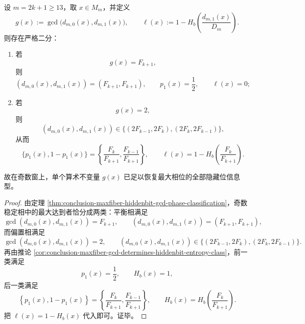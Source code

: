 \begin{theorem}\label{thm:conclusion-maxfiber-odd-gcd-determines-leakage-type}
设 \(m=2k+1\ge 13\)，取 \(x\in M_m\)，并定义
\[
g(x):=\gcd\bigl(d_{m,0}(x),d_{m,1}(x)\bigr),
\qquad
\ell(x):=1-H_b\!\left(\frac{d_{m,1}(x)}{D_m}\right).
\]
则存在严格二分：
\begin{enumerate}
\normalfont
  \item 若
  \[
  g(x)=F_{k+1},
  \]
  则
  \[
  (d_{m,0}(x),d_{m,1}(x))=(F_{k+1},F_{k+1}),
  \qquad
  p_1(x)=\frac12,
  \qquad
  \ell(x)=0;
  \]
  \item 若
  \[
  g(x)=2,
  \]
  则
  \[
  (d_{m,0}(x),d_{m,1}(x))
  \in
  \{(2F_{k-1},2F_k),(2F_k,2F_{k-1})\},
  \]
  从而
  \[
  \{p_1(x),1-p_1(x)\}
  =
  \left\{
  \frac{F_k}{F_{k+1}},
  \frac{F_{k-1}}{F_{k+1}}
  \right\},
  \qquad
  \ell(x)=1-H_b\!\left(\frac{F_k}{F_{k+1}}\right).
  \]
\end{enumerate}
故在奇数窗上，单个算术不变量 \(g(x)\) 已足以恢复最大相位的全部隐藏位信息型。
\end{theorem}
\begin{proof}
由定理 \ref{thm:conclusion-maxfiber-hiddenbit-gcd-phase-classification}，奇数稳定相中的最大达到者恰分成两类：平衡相满足
\[
\gcd(d_{m,0}(x),d_{m,1}(x))=F_{k+1},
\qquad
(d_{m,0}(x),d_{m,1}(x))=(F_{k+1},F_{k+1}),
\]
而偏置相满足
\[
\gcd(d_{m,0}(x),d_{m,1}(x))=2,
\qquad
(d_{m,0}(x),d_{m,1}(x))
\in
\{(2F_{k-1},2F_k),(2F_k,2F_{k-1})\}.
\]
再由推论 \ref{cor:conclusion-maxfiber-gcd-determines-hiddenbit-entropy-class}，前一类满足
\[
p_1(x)=\frac12,
\qquad
H_b(x)=1,
\]
后一类满足
\[
\left\{p_1(x),1-p_1(x)\right\}
=
\left\{
\frac{F_k}{F_{k+1}},
\frac{F_{k-1}}{F_{k+1}}
\right\},
\qquad
H_b(x)=H_b\!\left(\frac{F_k}{F_{k+1}}\right).
\]
把 \(\ell(x)=1-H_b(x)\) 代入即可。证毕。
\end{proof}

